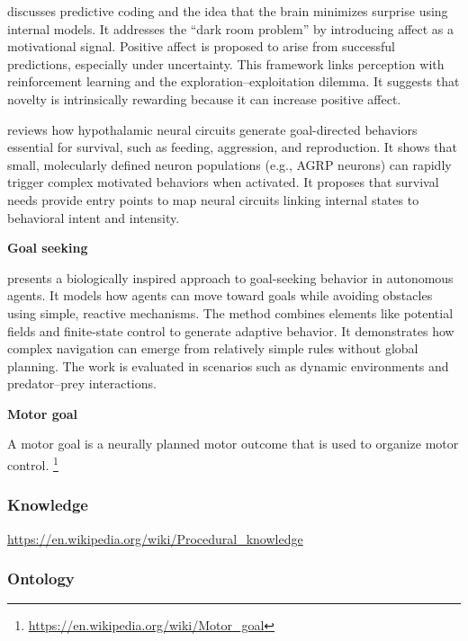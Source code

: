 \documentclass{book}
\providecommand{\ProjectDeepHeading}[2]{%
    \par\medskip\noindent\textbf{#2}\par\smallskip
}
\providecommand{\seeherefooter}[1]{\footnote{\url{#1}}}
\begin{document}
    \cite{trapp-2017-commentary-on-the-joys-of-perceiving-affect-as-feedback-for-perceptual-predictions} discusses predictive coding and the idea that the brain minimizes surprise using internal models. It addresses the “dark room problem” by introducing affect as a motivational signal. Positive affect is proposed to arise from successful predictions, especially under uncertainty. This framework links perception with reinforcement learning and the exploration–exploitation dilemma. It suggests that novelty is intrinsically rewarding because it can increase positive affect.
    
    \cite{sternson-2013-hypothalamic-survival-circuits-blueprints-for-purposive-behaviors} reviews how hypothalamic neural circuits generate goal-directed behaviors essential for survival, such as feeding, aggression, and reproduction.
    It shows that small, molecularly defined neuron populations (e.g., AGRP neurons) can rapidly trigger complex motivated behaviors when activated.
    It proposes that survival needs provide entry points to map neural circuits linking internal states to behavioral intent and intensity.
    
    
    \ProjectDeepHeading{1}{Goal seeking}
        \cite{kerr-2017-biological-goal-seeking} presents a biologically inspired approach to goal-seeking behavior in autonomous agents. It models how agents can move toward goals while avoiding obstacles using simple, reactive mechanisms. The method combines elements like potential fields and finite-state control to generate adaptive behavior.
        It demonstrates how complex navigation can emerge from relatively simple rules without global planning. The work is evaluated in scenarios such as dynamic environments and predator–prey interactions.
        
    \ProjectDeepHeading{1}{Motor goal}
        A motor goal is a neurally planned motor outcome that is used to organize motor control.
        \seeherefooter{https://en.wikipedia.org/wiki/Motor_goal}

\subsubsection{Knowledge}


\url{https://en.wikipedia.org/wiki/Procedural_knowledge}

\subsubsection{Ontology}
\end{document}
